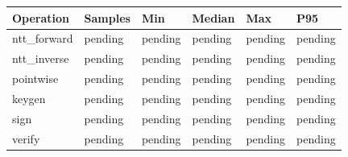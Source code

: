 \begin{tabular}{llllll}
\hline
Operation & Samples & Min & Median & Max & P95 \\
\hline
ntt\_forward & pending & pending & pending & pending & pending \\
ntt\_inverse & pending & pending & pending & pending & pending \\
pointwise & pending & pending & pending & pending & pending \\
keygen & pending & pending & pending & pending & pending \\
sign & pending & pending & pending & pending & pending \\
verify & pending & pending & pending & pending & pending \\
\hline
\end{tabular}

